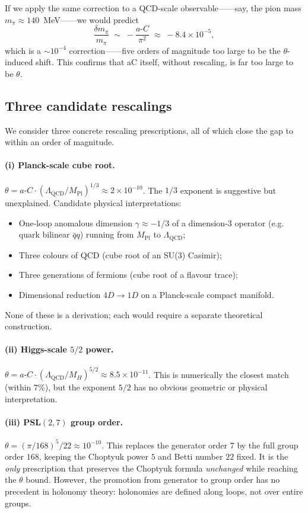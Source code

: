 \documentclass[11pt,a4paper]{article}
\newcommand{\aC}{a\text{-}C}
\newcommand{\LamQ}{\Lambda_{\mathrm{QCD}}}
\newcommand{\MP}{M_{\mathrm{Pl}}}
\theoremstyle{plain}
\theoremstyle{definition}
\theoremstyle{remark}
\begin{document}
If we apply the same correction to a QCD-scale observable——say, the
pion mass $m_\pi\approx 140$~MeV——we would predict
\begin{equation}
  \frac{\delta m_\pi}{m_\pi} \;\sim\; -\frac{\aC}{\pi^2}
  \;\approx\; -8.4\times 10^{-5},
\end{equation}
which is a $\sim 10^{-4}$ correction——five orders of magnitude too
large to be the $\theta$-induced shift.  This confirms that \aC{}
itself, without rescaling, is far too large to be $\theta$.

\subsection{Three candidate rescalings}\label{ssec:rescalings}

We consider three concrete rescaling prescriptions, all of which
close the gap to within an order of magnitude.

\paragraph{(i) Planck-scale cube root.}
$\theta = \aC\cdot(\LamQ/\MP)^{1/3}\approx 2\times 10^{-10}$.
The $1/3$ exponent is suggestive but unexplained.  Candidate physical
interpretations:
\begin{itemize}[leftmargin=2em,itemsep=0.1em]
  \item One-loop anomalous dimension $\gamma\approx -1/3$ of a
        dimension-$3$ operator (e.g. quark bilinear $\bar q q$) running
        from $\MP$ to $\LamQ$;
  \item Three colours of QCD (cube root of an SU(3) Casimir);
  \item Three generations of fermions (cube root of a flavour trace);
  \item Dimensional reduction $4D\to 1D$ on a Planck-scale compact
        manifold.
\end{itemize}
None of these is a derivation; each would require a separate
theoretical construction.

\paragraph{(ii) Higgs-scale $5/2$ power.}
$\theta = \aC\cdot(\LamQ/M_H)^{5/2}\approx 8.5\times 10^{-11}$.
This is numerically the closest match (within $7\%$), but the exponent
$5/2$ has no obvious geometric or physical interpretation.

\paragraph{(iii) PSL$(2,7)$ group order.}
$\theta = (\pi/168)^5 / 22 \approx 10^{-10}$.
This replaces the generator order $7$ by the full group order $168$,
keeping the Choptyuk power $5$ and Betti number $22$ fixed.  It is the
\emph{only} prescription that preserves the Choptyuk formula
\emph{unchanged} while reaching the $\theta$ bound.  However, the
promotion from generator to group order has no precedent in holonomy
theory: holonomies are defined along loops, not over entire groups.
\end{document}

